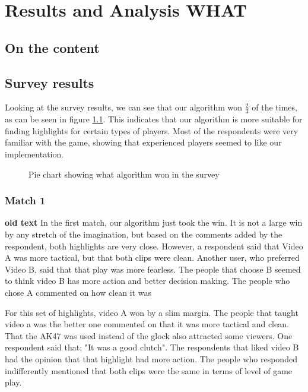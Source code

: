 \chapter{Results and Analysis WHAT}
\label{chp:results}
\section{On the content}
\section{Survey results}
\label{chp:surveyResults}
Looking at the survey results, we can see that our algorithm won $\frac{2}{3}$ of the times, as can be seen in figure \ref{fig:surveyOverall}. This indicates that our algorithm is more suitable for finding highlights for certain types of players. Most of the respondents were very familiar with the game, showing that experienced players seemed to like our implementation.
\begin{figure}
\centering
{}
\caption{Pie chart showing what algorithm won in the survey}
\label{fig:surveyOverall}
\end{figure}
\subsection{Match 1}
\textbf{old text}
In the first match, our algorithm just took the win. It is not a large win by any stretch of the imagination, but based on the comments added by the respondent, both highlights are very close. However, a respondent said that Video A was more tactical, but that both clips were clean. Another user, who preferred Video B, said that that play was more fearless. The people that choose B seemed to think video B has more action and better decision making. The people who chose A commented on how \gls{clean} it was

For this set of highlights, video A won by a slim margin. The people that taught video a was the better one commented on that it was more tactical and \gls{clean}. That the AK47 was used instead of the glock also attracted some viewers. One respondent said that; "It was a good clutch". The respondents that liked video B had the opinion that that highlight had more action. The people who responded indifferently mentioned that both clips were the same in terms of level of game play.

